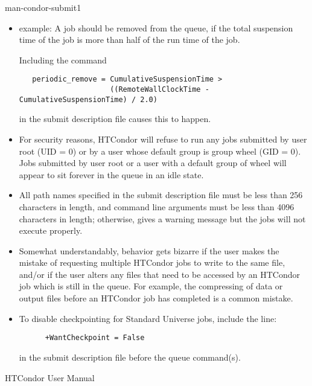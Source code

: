 \begin{ManPage}{}{man-condor-submit}{1}
\begin{itemize}
\item{ example:}
A job should be removed from the queue,
if the total suspension time of the job
is more than half of the run time of the job.

Including the command
\footnotesize
\begin{verbatim}
   periodic_remove = CumulativeSuspensionTime > 
                     ((RemoteWallClockTime - CumulativeSuspensionTime) / 2.0)
\end{verbatim}
\normalsize
in the submit description file causes this to happen.

\end{itemize} 


\GenRem
\begin{itemize}

\item For security reasons, HTCondor will refuse to run any jobs submitted
by user root (UID = 0) or by a user whose default group is group wheel
(GID = 0). Jobs submitted by user root or a user with a default group of
wheel will appear to sit forever in the queue in an idle state. 

\item All path names specified in the submit description file must be
less than 256 characters in length, and command line arguments must be
less than 4096 characters in length; otherwise,  gives a
warning message but the jobs will not execute properly. 

\item Somewhat understandably, behavior gets bizarre if the user makes
the mistake of requesting multiple HTCondor jobs to write to the
same file, and/or if the user alters any files that need to be accessed
by an HTCondor job which is still in the queue.
For example, the compressing of data or
output files before an HTCondor job has completed is a common mistake.

\item To disable checkpointing for Standard Universe jobs, include the
line:
\begin{verbatim}
      +WantCheckpoint = False
\end{verbatim}
in the submit description file before the queue command(s).
\end{itemize}

\SeeAlso
HTCondor User Manual

\end{ManPage}

